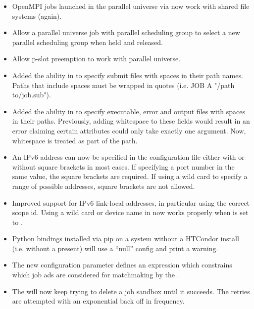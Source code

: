 \begin{itemize}
\item OpenMPI jobs launched in the parallel universe via 
now work with shared file systems (again).

\item Allow a parallel universe job with parallel scheduling group to
select a new parallel scheduling group when held and released.

\item Allow p-slot preemption to work with parallel universe.

\item Added the ability in  to specify submit files with spaces
in their path names. Paths that include spaces must be wrapped in quotes
(i.e. JOB A "/path to/job.sub").

\item Added the ability in  to specify executable, error and
output files with spaces in their paths. Previously, adding whitespace to these
fields would result in an error claiming certain attributes could only take
exactly one argument. Now, whitespace is
treated as part of the path.

\item An IPv6 address can now be specified in the configuration file
either with or without square brackets in most cases.
If specifying a port number in the same value, the square brackets are
required.
If using a wild card to specify a range of possible addresses, square
brackets are not allowed.

\item Improved support for IPv6 link-local addresses, in particular
using the correct scope id.
Using a wild card or device name in  now
works properly when  is set to .

\item Python bindings installed via pip on a system without a
HTCondor install (i.e. without a  present)
will use a ``null'' config and print a warning.

\item The new configuration parameter 
defines an expression which constrains which job ads are considered for
matchmaking by the .

\item The  will now keep trying to delete a job sandbox until it succeeds.
The retries are attempted with an exponential back off in frequency.


\end{itemize}
